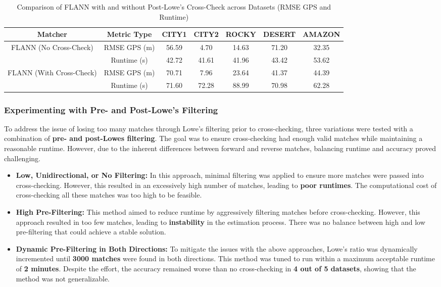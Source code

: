 \begin{table}[H]
    \centering
    \begin{tabular}{|c|c|c|c|c|c|c|}
    \hline
    \textbf{Matcher} & \textbf{Metric Type} & \textbf{CITY1} & \textbf{CITY2} & \textbf{ROCKY} & \textbf{DESERT} & \textbf{AMAZON} \\
    \hline
    \multirow{2}{*}{FLANN (No Cross-Check)} & 
    RMSE GPS (m) & 56.59 & 4.70 & 14.63 & 71.20 & 32.35 \\
    \cline{2-7}
    & Runtime (s) & 42.72 & 41.61 & 41.96 & 43.42 & 53.62 \\
    \hline
    \multirow{2}{*}{FLANN (With Cross-Check)} & 
    RMSE GPS (m) & 70.71 & 7.96 & 23.64 & 41.37 & 44.39 \\
    \cline{2-7}
    & Runtime (s) & 71.60 & 72.28 & 88.99 & 70.98 & 62.28 \\
    \hline
    \end{tabular}
    \caption{Comparison of FLANN with and without Post-Lowe's Cross-Check across Datasets (RMSE GPS and Runtime)}
    \label{tab:flann_comparison}
\end{table}

\subsubsection{Experimenting with Pre- and Post-Lowe’s Filtering}  
To address the issue of losing too many matches through Lowe’s filtering prior to cross-checking, three variations were tested with a combination of \textbf{pre- and post-Lowes filtering}. The goal was to ensure cross-checking had enough valid matches while maintaining a reasonable runtime. However, due to the inherent differences between forward and reverse matches, balancing runtime and accuracy proved challenging.

\begin{itemize}
    \item \textbf{Low, Unidirectional, or No Filtering:}  
    In this approach, minimal filtering was applied to ensure more matches were passed into cross-checking. However, this resulted in an excessively high number of matches, leading to \textbf{poor runtimes}. The computational cost of cross-checking all these matches was too high to be feasible.

    \item \textbf{High Pre-Filtering:}  
    This method aimed to reduce runtime by aggressively filtering matches before cross-checking. However, this approach resulted in too few matches, leading to \textbf{instability} in the estimation process. There was no balance between high and low pre-filtering that could achieve a stable solution.

    \item \textbf{Dynamic Pre-Filtering in Both Directions:}  
    To mitigate the issues with the above approaches, Lowe’s ratio was dynamically incremented until \textbf{3000 matches} were found in both directions. This method was tuned to run within a maximum acceptable runtime of \textbf{2 minutes}. Despite the effort, the accuracy remained worse than no cross-checking in \textbf{4 out of 5 datasets}, showing that the method was not generalizable.
\end{itemize}

